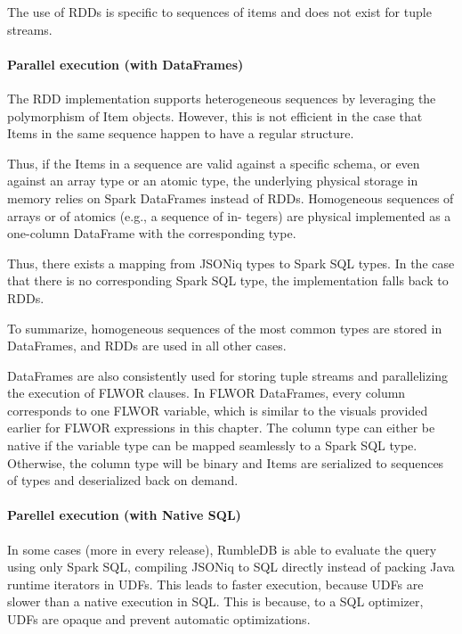 The use of RDDs is specific to sequences of items and does not exist for tuple streams.

\paragraph{Parallel execution (with DataFrames)}

The RDD implementation supports heterogeneous sequences by leveraging the polymorphism of Item objects. However, this is not efficient in the case that Items in the same sequence happen to have a regular structure.

Thus, if the Items in a sequence are valid against a specific schema, or even against an array type or an atomic type, the underlying physical storage in memory relies on Spark DataFrames instead of RDDs. Homogeneous sequences of arrays or of atomics (e.g., a sequence of in- tegers) are physical implemented as a one-column DataFrame with the corresponding type.

Thus, there exists a mapping from JSONiq types to Spark SQL types. In the case that there is no corresponding Spark SQL type, the implementation falls back to RDDs.

To summarize, homogeneous sequences of the most common types are stored in DataFrames, and RDDs are used in all other cases.

DataFrames are also consistently used for storing tuple streams and parallelizing the execution of FLWOR clauses. In FLWOR DataFrames, every column corresponds to one FLWOR variable, which is similar to the visuals provided earlier for FLWOR expressions in this chapter. The column type can either be native if the variable type can be mapped seamlessly to a Spark SQL type. Otherwise, the column type will be binary and Items are serialized to sequences of types and deserialized back on demand.


\paragraph{Parellel execution (with Native SQL)}

In some cases (more in every release), RumbleDB is able to evaluate the query using only Spark SQL, compiling JSONiq to SQL directly instead of packing Java runtime iterators in UDFs. This leads to faster execution, because UDFs are slower than a native execution in SQL. This is because, to a SQL optimizer, UDFs are opaque and prevent automatic optimizations.

